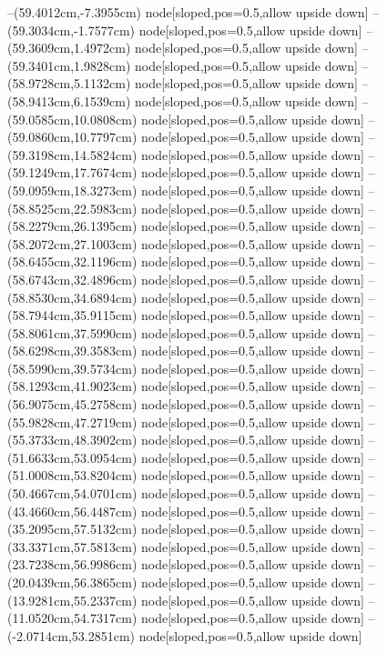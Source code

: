 --(59.4012cm,-7.3955cm) node[sloped,pos=0.5,allow upside down]{\ArrowIn}
--(59.3034cm,-1.7577cm) node[sloped,pos=0.5,allow upside down]{\ArrowIn}
--(59.3609cm,1.4972cm) node[sloped,pos=0.5,allow upside down]{\ArrowIn}
--(59.3401cm,1.9828cm) node[sloped,pos=0.5,allow upside down]{\arrowIn}
--(58.9728cm,5.1132cm) node[sloped,pos=0.5,allow upside down]{\ArrowIn}
--(58.9413cm,6.1539cm) node[sloped,pos=0.5,allow upside down]{\ArrowIn}
--(59.0585cm,10.0808cm) node[sloped,pos=0.5,allow upside down]{\ArrowIn}
--(59.0860cm,10.7797cm) node[sloped,pos=0.5,allow upside down]{\arrowIn}
--(59.3198cm,14.5824cm) node[sloped,pos=0.5,allow upside down]{\ArrowIn}
--(59.1249cm,17.7674cm) node[sloped,pos=0.5,allow upside down]{\ArrowIn}
--(59.0959cm,18.3273cm) node[sloped,pos=0.5,allow upside down]{\arrowIn}
--(58.8525cm,22.5983cm) node[sloped,pos=0.5,allow upside down]{\ArrowIn}
--(58.2279cm,26.1395cm) node[sloped,pos=0.5,allow upside down]{\ArrowIn}
--(58.2072cm,27.1003cm) node[sloped,pos=0.5,allow upside down]{\arrowIn}
--(58.6455cm,32.1196cm) node[sloped,pos=0.5,allow upside down]{\ArrowIn}
--(58.6743cm,32.4896cm) node[sloped,pos=0.5,allow upside down]{\arrowIn}
--(58.8530cm,34.6894cm) node[sloped,pos=0.5,allow upside down]{\ArrowIn}
--(58.7944cm,35.9115cm) node[sloped,pos=0.5,allow upside down]{\ArrowIn}
--(58.8061cm,37.5990cm) node[sloped,pos=0.5,allow upside down]{\ArrowIn}
--(58.6298cm,39.3583cm) node[sloped,pos=0.5,allow upside down]{\ArrowIn}
--(58.5990cm,39.5734cm) node[sloped,pos=0.5,allow upside down]{\arrowIn}
--(58.1293cm,41.9023cm) node[sloped,pos=0.5,allow upside down]{\ArrowIn}
--(56.9075cm,45.2758cm) node[sloped,pos=0.5,allow upside down]{\ArrowIn}
--(55.9828cm,47.2719cm) node[sloped,pos=0.5,allow upside down]{\ArrowIn}
--(55.3733cm,48.3902cm) node[sloped,pos=0.5,allow upside down]{\ArrowIn}
--(51.6633cm,53.0954cm) node[sloped,pos=0.5,allow upside down]{\ArrowIn}
--(51.0008cm,53.8204cm) node[sloped,pos=0.5,allow upside down]{\arrowIn}
--(50.4667cm,54.0701cm) node[sloped,pos=0.5,allow upside down]{\arrowIn}
--(43.4660cm,56.4487cm) node[sloped,pos=0.5,allow upside down]{\ArrowIn}
--(35.2095cm,57.5132cm) node[sloped,pos=0.5,allow upside down]{\ArrowIn}
--(33.3371cm,57.5813cm) node[sloped,pos=0.5,allow upside down]{\ArrowIn}
--(23.7238cm,56.9986cm) node[sloped,pos=0.5,allow upside down]{\ArrowIn}
--(20.0439cm,56.3865cm) node[sloped,pos=0.5,allow upside down]{\ArrowIn}
--(13.9281cm,55.2337cm) node[sloped,pos=0.5,allow upside down]{\ArrowIn}
--(11.0520cm,54.7317cm) node[sloped,pos=0.5,allow upside down]{\ArrowIn}
--(-2.0714cm,53.2851cm) node[sloped,pos=0.5,allow upside down]{\ArrowIn}
